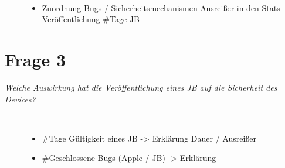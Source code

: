      
\begin{description}
    \item[\parbox{\textwidth} {Antwort kurz INFO Katharina}]~\par
        \begin{itemize}
                \item Zuordnung Bugs / Sicherheitsmechanismen Ausreißer in den Stats Veröffentlichung \#Tage JB  
        \end{itemize}
\end{description} 
        


\section{Frage 3}
\label{sec:Frage3}
\textit{\glqq Welche Auswirkung hat die Veröffentlichung eines JB auf die Sicherheit des Devices?\grqq{}}
\begin{description}
    \item[\parbox{\textwidth} {Antwort kurz INFO Katharina}]~\par
        \begin{itemize}
                \item \#Tage Gültigkeit eines JB -> Erklärung Dauer / Ausreißer
                \item \#Geschlossene Bugs (Apple / JB)   -> Erklärung 
        \end{itemize}
\end{description} 
 